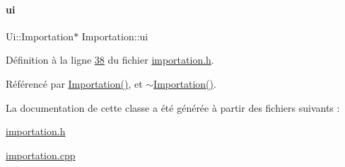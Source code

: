 \paragraph{\texorpdfstring{ui}{ui}}
{\footnotesize\ttfamily Ui\+::\+Importation$\ast$ Importation\+::ui\hspace{0.3cm}{\ttfamily [private]}}



Définition à la ligne \hyperlink{importation_8h_source_l00038}{38} du fichier \hyperlink{importation_8h_source}{importation.\+h}.



Référencé par \hyperlink{importation_8cpp_source_l00004}{Importation()}, et \hyperlink{importation_8cpp_source_l00010}{$\sim$\+Importation()}.



La documentation de cette classe a été générée à partir des fichiers suivants \+:\begin{DoxyCompactItemize}
\item 
\hyperlink{importation_8h}{importation.\+h}\item 
\hyperlink{importation_8cpp}{importation.\+cpp}\end{DoxyCompactItemize}
